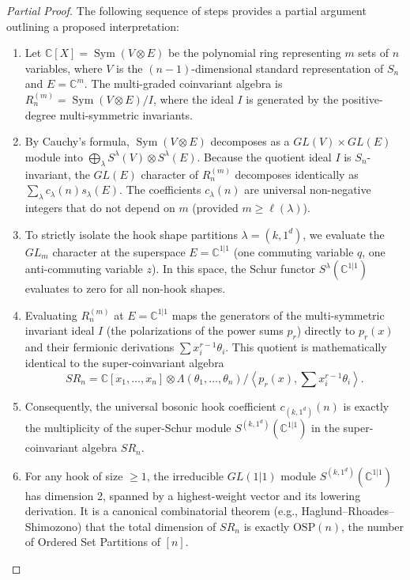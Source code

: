 \begin{proof}[Partial Proof]
The following sequence of steps provides a partial argument outlining a proposed interpretation:

\begin{enumerate}
    \item Let $\mathbb{C}[X] = \operatorname{Sym}(V \otimes E)$ be the polynomial ring representing $m$ sets of $n$ variables, where $V$ is the $(n-1)$-dimensional standard representation of $S_n$ and $E = \mathbb{C}^m$. The multi-graded coinvariant algebra is $R_n^{(m)} = \operatorname{Sym}(V \otimes E) / I$, where the ideal $I$ is generated by the positive-degree multi-symmetric invariants.
    
    \item By Cauchy's formula, $\operatorname{Sym}(V \otimes E)$ decomposes as a $GL(V) \times GL(E)$ module into $\bigoplus_{\lambda} S^\lambda(V) \otimes S^\lambda(E)$. Because the quotient ideal $I$ is $S_n$-invariant, the $GL(E)$ character of $R_n^{(m)}$ decomposes identically as $\sum_\lambda c_\lambda(n) s_\lambda(E)$. The coefficients $c_\lambda(n)$ are universal non-negative integers that do not depend on $m$ (provided $m \ge \ell(\lambda)$).
    
    \item To strictly isolate the hook shape partitions $\lambda = (k, 1^d)$, we evaluate the $GL_m$ character at the superspace $E = \mathbb{C}^{1|1}$ (one commuting variable $q$, one anti-commuting variable $z$). In this space, the Schur functor $S^\lambda(\mathbb{C}^{1|1})$ evaluates to zero for all non-hook shapes. 
    
    \item Evaluating $R_n^{(m)}$ at $E = \mathbb{C}^{1|1}$ maps the generators of the multi-symmetric invariant ideal $I$ (the polarizations of the power sums $p_r$) directly to $p_r(x)$ and their fermionic derivations $\sum x_i^{r-1} \theta_i$. This quotient is mathematically identical to the super-coinvariant algebra 
    \[
    SR_n = \mathbb{C}[x_1, \dots, x_n] \otimes \Lambda(\theta_1, \dots, \theta_n) / \left\langle p_r(x), \sum x_i^{r-1} \theta_i \right\rangle.
    \]
    
    \item Consequently, the universal bosonic hook coefficient $c_{(k, 1^d)}(n)$ is exactly the multiplicity of the super-Schur module $S^{(k, 1^d)}(\mathbb{C}^{1|1})$ in the super-coinvariant algebra $SR_n$. 
    
    \item For any hook of size $\ge 1$, the irreducible $GL(1|1)$ module $S^{(k, 1^d)}(\mathbb{C}^{1|1})$ has dimension 2, spanned by a highest-weight vector and its lowering derivation. It is a canonical combinatorial theorem (e.g., Haglund--Rhoades--Shimozono) that the total dimension of $SR_n$ is exactly $\mathrm{OSP}(n)$, the number of Ordered Set Partitions of $[n]$.
    

\end{enumerate}
\end{proof}
